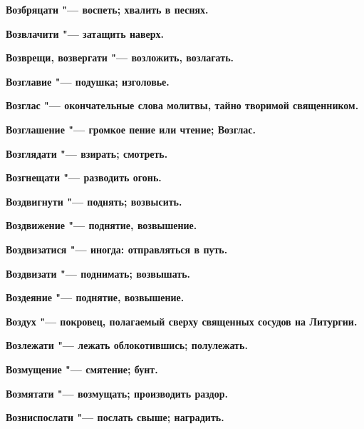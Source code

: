 \begin{multicols}{2}
\bfseries Возбряцати\normalfont{} "--- воспеть; хвалить в песнях. 




\bfseries Возвлачити\normalfont{} "--- затащить наверх. 




\bfseries Возврещи, возвергати\normalfont{} "--- возложить, возлагать. 




\bfseries Возглавие\normalfont{} "--- подушка; изголовье. 




\bfseries Возглас\normalfont{} "--- окончательные слова молитвы, тайно творимой священником. 




\bfseries Возглашение\normalfont{} "--- громкое пение или чтение; Возглас. 




\bfseries Возглядати\normalfont{} "--- взирать; смотреть. 




\bfseries Возгнещати\normalfont{} "--- разводить огонь. 




\bfseries Воздвигнути\normalfont{} "--- поднять; возвысить. 




\bfseries Воздвижение\normalfont{} "--- поднятие, возвышение. 




\bfseries Воздвизатися\normalfont{} "--- иногда: отправляться в путь. 




\bfseries Воздвизати\normalfont{} "--- поднимать; возвышать. 




\bfseries Воздеяние\normalfont{} "--- поднятие, возвышение. 




\bfseries Воздух\normalfont{} "--- покровец, полагаемый сверху священных сосудов на Литургии. 




\bfseries Возлежати\normalfont{} "--- лежать облокотившись; полулежать. 




\bfseries Возмущение\normalfont{} "--- смятение; бунт. 




\bfseries Возмятати\normalfont{} "--- возмущать; производить раздор. 




\bfseries Возниспослати\normalfont{} "--- послать свыше; наградить. 





\end{multicols}
